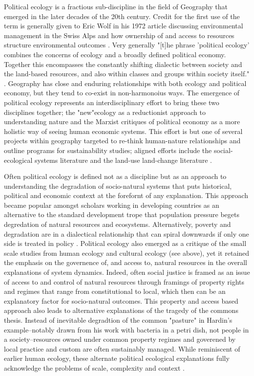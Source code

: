 Political ecology is a fractious sub-discipline in the field of Geography that emerged in the later decades of the 20th century. Credit for the first use of the term is generally given to Eric Wolf in his 1972 article discussing environmental management in the Swiss Alps and how ownership of and access to resources structure environmental outcomes \citep{wolf_1972}. Very generally "[t]he phrase 'political ecology' combines the concerns of ecology and a broadly defined political economy. Together this encompasses the constantly shifting dialectic between society and the land-based resources, and also within classes and groups within society itself." \citep[][p. 17]{blaikie_1987}. Geography has close and enduring relationships with both ecology and political economy, but they tend to co-exist in non-harmonoius ways. The emergence of political ecology represents an interdisciplinary effort to bring these two disciplines together; the "new"ecology as a reductionist approach to understanding nature and the Marxist critiques of political economy as a more holistic way of seeing human economic systems. This effort is but one of several projects within geography targeted to re-think human-nature relationships and outline programs for sustainability studies; aligned efforts include the social-ecological systems literature \citep{holling_2002} and the land-use land-change literature \citep{turner_2008}.

Often political ecology is defined not as a discipline but as an approach to understanding the degradation of socio-natural systems that puts historical, political and economic context at the forefornt of any explanation. This approach became popular amongst scholars working in developing countries as an alternative to the standard development trope that population pressure begets degredation of natural resources and ecosystems. Alternatively, poverty and degradation are in a dialectical relationship that can spiral downwards if only one side is treated in policy \citep{blaikie_1987, peet_1996}. Political ecology also emerged as a critique of the small scale studies from human ecology and cultural ecology (see above), yet it retained the emphasis on the governence of, and access to, natural resources in the overall explanations of system dynamics. Indeed, often social justice is framed as an issue of access to and control of natural resources  through framings of property rights and regimes that range from constitutional to local, which then can be an explanatory factor for socio-natural outcomes. This property and access based approach also leads to alternative explanations of the tragedy of the commons thesis. Instead of inevitable degradtion of the common "pasture" in Hardin's example--notably drawn from his work with bacteria in a petri dish, not people in a society--resources owned under common property regimes and goverened by local practice and custom are often sustainably managed. While reminiscent of earlier human ecology, these alternate political ecological explanations fully acknowledge the problems of scale, complexity and context \citep{ostrom_1999}. 

